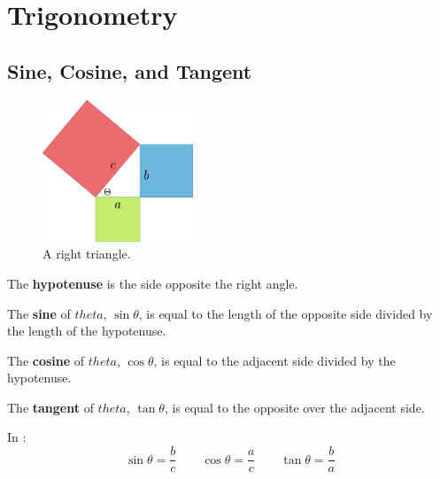 \chapter{Trigonometry}
\section{Sine, Cosine, and Tangent}
\begin{figure}[H]
  \begin{center}
    \includegraphics[width=0.4\textwidth]{continuous/trig/basictrig}
  \end{center}
  \caption{A right triangle.}
  \label{fig:right_triangle}
\end{figure}
\begin{defn}
    The \textbf{hypotenuse} is the side opposite the right angle.
\end{defn}
\begin{defn}
    The \textbf{sine} of $theta$, $\sin\theta$, is equal to the length of the opposite side divided by the length of the hypotenuse.
\end{defn}
\begin{defn}
    The \textbf{cosine} of $theta$, $\cos\theta$, is equal to the adjacent side divided by the hypotenuse.
\end{defn}
\begin{defn}
    The \textbf{tangent} of $theta$, $\tan\theta$, is equal to the opposite over the adjacent side.
\end{defn}
In :
  \[\displaystyle{\sin\theta=\frac{b}{c}}\qquad
  \displaystyle{\cos\theta=\frac{a}{c}}\qquad
  \displaystyle{\tan\theta=\frac{b}{a}}\]



